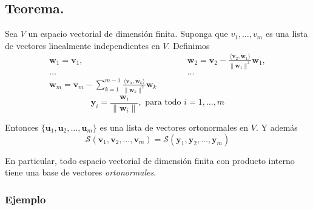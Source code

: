 \documentclass[
]{article}
\begin{document}
\hypertarget{teorema.}{%
\subsection{Teorema.}\label{teorema.}}

Sea \(V\) un espacio vectorial de dimensión finita. Suponga que
\(v_1,\ldots,v_m\) es una lista de vectores linealmente independientes
en \(V\). Definimos \[
\begin{matrix}
\mathbf{w}_1=\mathbf{v}_1, &\quad\quad & \mathbf{w}_2=\mathbf{v}_2 - \frac{\langle \mathbf{v}_2, \mathbf{w}_1 \rangle}{\|\mathbf{w}_1\|^2}\mathbf{w}_1, \\
 \ldots & \quad\quad & \ldots  \\
\mathbf{w}_m= \mathbf{v}_m - \sum_{k=1}^{m-1}\frac{\langle\mathbf{v}_n, \mathbf{w}_k\rangle}{\|\mathbf{w}_k\|^2}\mathbf{w}_{k}
\end{matrix}
\] \begin{equation}
  \mathbf{y}_i=\frac{\mathbf{w}_i}{\|\mathbf{w}_i\|},\mbox{ para todo }i=1,\ldots,m
\end{equation}

Entonces \(\{\mathbf{u}_1,\mathbf{u}_2,\ldots, \mathbf{u}_m\}\) es una
lista de vectores ortonormales en \(V\). Y además \[
\mathcal{S}(\mathbf{v}_1,\mathbf{v}_2,\ldots, \mathbf{v}_m) = \mathcal{S}(\mathbf{y}_1,\mathbf{y}_2,\ldots, \mathbf{y}_m)
\]

En particular, todo espacio vectorial de dimensión finita con producto
interno tiene una base de vectores \emph{ortonormales}.

\hypertarget{ejemplo}{%
\subsubsection{Ejemplo}\label{ejemplo}}
\end{document}
